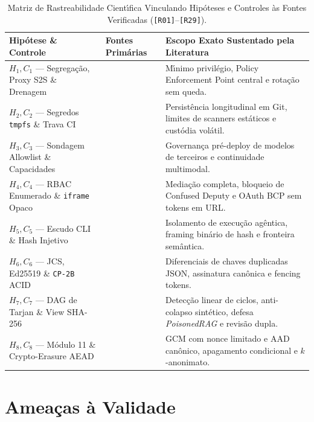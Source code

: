\documentclass[10pt,twocolumn]{article}
\begin{document}
\begin{table}[t]
\centering
\caption{Matriz de Rastreabilidade Cient\'{\i}fica Vinculando Hip\'{o}teses e Controles \`{a}s Fontes Verificadas (\texttt{[R01]}--\texttt{[R29]}).}
\label{tab:traceability_pt}
\footnotesize
\begin{tabularx}{\textwidth}{@{}l l Y@{}}
\toprule
\textbf{Hip\'{o}tese \& Controle} & \textbf{Fontes Prim\'{a}rias} & \textbf{Escopo Exato Sustentado pela Literatura} \\
\midrule
$H_1, C_1$ --- Segrega\c{c}\~{a}o, Proxy S2S \& Drenagem & \cite{R01,R16,R20} & M\'{\i}nimo privil\'{e}gio, Policy Enforcement Point central e rota\c{c}\~{a}o sem queda. \\
$H_2, C_2$ --- Segredos \texttt{tmpfs} \& Trava CI & \cite{R15,R18,R21} & Persist\^{e}ncia longitudinal em Git, limites de scanners est\'{a}ticos e cust\'{o}dia vol\'{a}til. \\
$H_3, C_3$ --- Sondagem Allowlist \& Capacidades & \cite{R24,R29} & Governan\c{c}a pr\'{e}-deploy de modelos de terceiros e continuidade multimodal. \\
$H_4, C_4$ --- RBAC Enumerado \& \texttt{iframe} Opaco & \cite{R01,R05,R28} & Media\c{c}\~{a}o completa, bloqueio de Confused Deputy e OAuth BCP sem tokens em URL. \\
$H_5, C_5$ --- Escudo CLI \& Hash Injetivo & \cite{R04,R22,R25,R27} & Isolamento de execu\c{c}\~{a}o ag\^{e}ntica, framing bin\'{a}rio de hash e fronteira sem\^{a}ntica. \\
$H_6, C_6$ --- JCS, Ed25519 \& \texttt{CP-2B} ACID & \cite{R03,R11,R12,R13,R17,R19} & Diferenciais de chaves duplicadas JSON, assinatura can\^{o}nica e fencing tokens. \\
$H_7, C_7$ --- DAG de Tarjan \& View SHA-256 & \cite{R02,R08,R23,R26} & Detec\c{c}\~{a}o linear de ciclos, anti-colapso sint\'{e}tico, defesa \emph{PoisonedRAG} e revis\~{a}o dupla. \\
$H_8, C_8$ --- M\'{o}dulo 11 \& Crypto-Erasure AEAD & \cite{R06,R07,R09,R10,R14,R29} & GCM com nonce limitado e AAD can\^{o}nico, apagamento condicional e $k$-anonimato. \\
\bottomrule
\end{tabularx}
\end{table}

\section{Amea\c{c}as \`{a} Validade}
\end{document}
